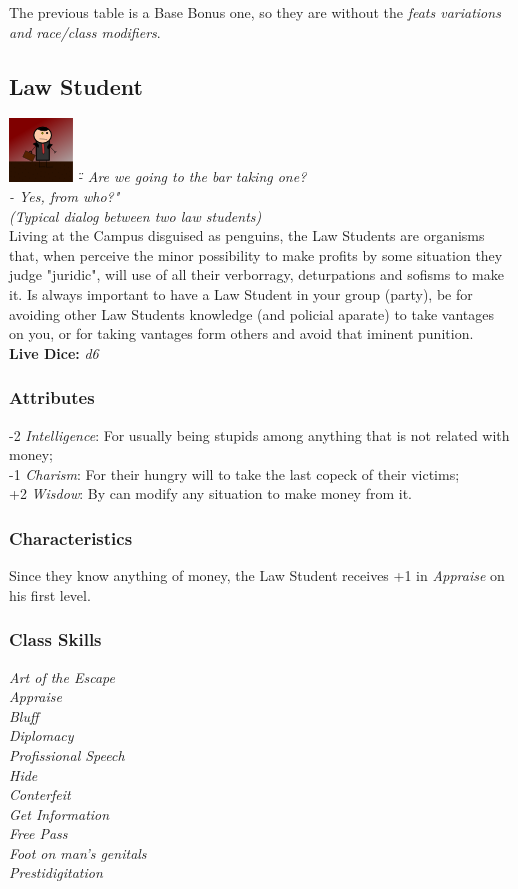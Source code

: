 \documentclass[ letterpaper,12pt]{article}
\begin{document}
The previous table is a Base Bonus one, so they are without the {\it feats variations and race/class modifiers}.\\

\subsection{Law Student}
\includegraphics{../data/classes/Img/direito.png}
{\it \" - Are we going to the bar taking one?\\
        - Yes, from who?"\\(Typical dialog between two law students)}\\

Living at the Campus disguised as penguins, the Law Students are organisms
that, when perceive the minor possibility to make profits by some situation
they judge "juridic", will use of all their verborragy, deturpations and
sofisms to make it. Is always important to have a Law Student in your group
(party), be for avoiding other Law Students knowledge (and policial aparate) to
take vantages on you, or for taking vantages form others and avoid that iminent
punition.\\

{\bf Live Dice:} {\it d6}

\subsubsection{Attributes}
-2 {\it Intelligence}: For usually being stupids among anything that is not related with money;\\
-1 {\it Charism}: For their hungry will to take the last copeck of their victims;\\
+2 {\it Wisdow}: By can modify any situation to make money from it.\\

\subsubsection{Characteristics}

Since they know anything of money, the Law Student receives +1 in {\it Appraise} on his first level.

\subsubsection{Class Skills}
{\it
Art of the Escape\\
Appraise\\
Bluff\\
Diplomacy\\
Profissional Speech\\
Hide\\
Conterfeit\\
Get Information\\
Free Pass\\
Foot on man's genitals\\
Prestidigitation}
\end{document}
